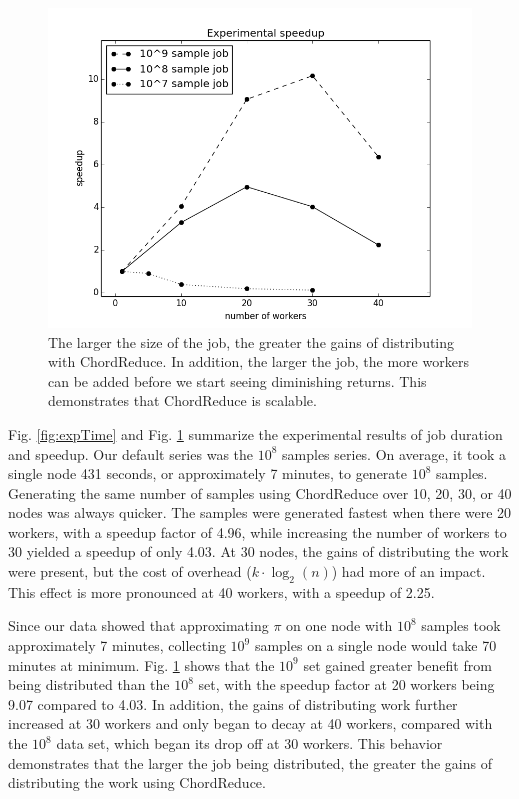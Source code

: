 \begin{figure}
	\centering
	\includegraphics[width=0.7\linewidth]{figs/expSpeed}
	\caption[ChordReduce workers vs speedup]{The larger the size of the job, the greater the gains of distributing with ChordReduce.  In addition, the larger the job, the more workers can be added before we start seeing diminishing returns.  This demonstrates that ChordReduce is scalable.}
	\label{fig:expSpeed}
\end{figure}

Fig. \ref{fig:expTime} and Fig. \ref{fig:expSpeed} summarize the experimental results of job duration and speedup.  Our default series was the $10^{8}$ samples series.  On average, it took a single node 431 seconds, or approximately 7 minutes, to generate $10^{8}$ samples.  Generating the same number of samples using ChordReduce over 10, 20, 30, or 40 nodes was always quicker.  The samples were generated fastest when there were 20 workers, with a speedup factor of 4.96, while increasing the number of workers to 30 yielded a speedup of only 4.03.  At 30 nodes, the gains of distributing the work were present, but the cost of overhead ($k \cdot \log_{2}(n)$) had more of an impact.  This effect is more pronounced at 40 workers, with a speedup of 2.25.

Since our data showed that approximating $\pi$ on one node with $10^{8}$ samples took approximately 7 minutes, collecting $10^{9}$ samples on a single node would take 70 minutes at minimum.  Fig. \ref{fig:expSpeed} shows that the $10^{9}$ set gained greater benefit from being distributed than the $10^{8}$ set, with the speedup factor at 20 workers being 9.07 compared to 4.03.  In addition, the gains of distributing work further increased at 30 workers and only began to decay at 40 workers, compared with the $10^{8}$ data set, which began its drop off at 30 workers. This behavior demonstrates that the larger the job being distributed, the greater the gains of distributing the work using ChordReduce.

